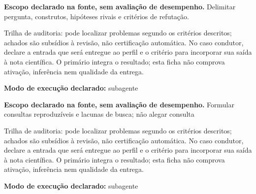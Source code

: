 
\begin{descricao}
\textbf{Escopo declarado na fonte, sem avaliação de desempenho.}
Delimitar pergunta, construtos, hipóteses rivais e critérios de refutação.
\end{descricao}

\begin{funcao}
Trilha de auditoria: pode localizar problemas segundo os critérios descritos; achados são subsídios à revisão, não certificação automática. No caso condutor, declare a entrada que será entregue ao perfil e o critério para incorporar sua saída à nota científica. O primário integra o resultado; esta ficha não comprova ativação, inferência nem qualidade da entrega.
\end{funcao}

\begin{arquitetura}
\textbf{Modo de execução declarado:} subagente
\end{arquitetura}


\begin{descricao}
\textbf{Escopo declarado na fonte, sem avaliação de desempenho.}
Formular consultas reproduzíveis e lacunas de busca; não alegar consulta
\end{descricao}

\begin{funcao}
Trilha de auditoria: pode localizar problemas segundo os critérios descritos; achados são subsídios à revisão, não certificação automática. No caso condutor, declare a entrada que será entregue ao perfil e o critério para incorporar sua saída à nota científica. O primário integra o resultado; esta ficha não comprova ativação, inferência nem qualidade da entrega.
\end{funcao}

\begin{arquitetura}
\textbf{Modo de execução declarado:} subagente
\end{arquitetura}

